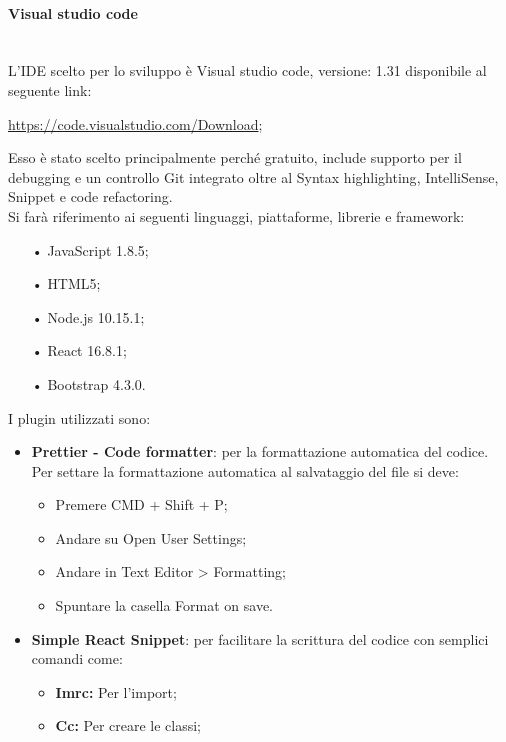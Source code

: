 \paragraph{Visual studio code}\mbox{}\\
L'{IDE} scelto per lo sviluppo è {Visual studio code}, versione: 1.31 disponibile al seguente link:
\begin{center}
	\url{https://code.visualstudio.com/Download};
\end{center}
Esso è stato scelto principalmente perché gratuito, include supporto per il debugging e un controllo Git integrato oltre al {Syntax highlighting}, {IntelliSense}, {Snippet} e {code refactoring}.\\
Si farà riferimento ai seguenti linguaggi, piattaforme, librerie e framework:
\begin{itemize}
	\item[•]{JavaScript} 1.8.5;
	\item[•]{HTML5};
	\item[•]{Node.js} 10.15.1;
	\item[•]{React} 16.8.1;
	\item[•]{Bootstrap} 4.3.0.
\end{itemize}

I plugin utilizzati sono:
\begin{itemize}
	\item \textbf{Prettier - Code formatter}: per la formattazione automatica del codice.
	Per settare la formattazione automatica al salvataggio del file si deve:
	\begin{itemize}
		\item Premere CMD + Shift + P;
		\item Andare su Open User Settings;
		\item Andare in Text Editor > Formatting;
		\item Spuntare la casella Format on save.
	\end{itemize}
	\item \textbf{Simple React Snippet}: per facilitare la scrittura del codice con semplici comandi come:
	\begin{itemize}
		\item \textbf{Imrc:} Per l'import;
		\item \textbf{Cc:} Per creare le classi;
		
	\end{itemize}
\end{itemize}

